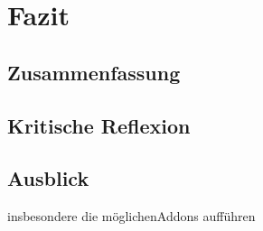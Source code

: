 \chapter{Fazit}
\label{chap:Fazit}

	\section{Zusammenfassung}
	\label{sec:Zusammenfassung}
			
	\section{Kritische Reflexion}
	\label{sec:KritischeReflexion}
			
	\section{Ausblick}
	\label{sec:Ausblick}
		insbesondere die möglichenAddons aufführen


